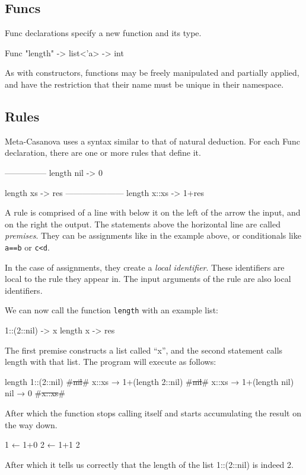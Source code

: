 \subsection{Funcs}
Func declarations specify a new function and its type.

\begin{code}
Func "length" -> list<'a> -> int
\end{code}

As with constructors, functions may be freely manipulated and partially applied, and have the restriction that their name must be unique in their namespace.

\subsection{Rules}
Meta-Casanova uses a syntax similar to that of natural deduction.
For each Func declaration, there are one or more rules that define it.

\begin{code}
---------------
length nil -> 0

length xs -> res
---------------------
length x::xs -> 1+res
\end{code}

A rule is comprised of a line with below it on the left of the arrow the input, and on the right the output.
The statements above the horizontal line are called \textit{premises}\label{premises}.
They can be assignments like in the example above, or conditionals like \verb|a==b| or \verb|c<d|.

In the case of assignments, they create a \textit{local identifier}.
These identifiers are local to the rule they appear in.
The input arguments of the rule are also local identifiers.

We can now call the function \verb|length| with an example list:

\begin{code}
  1::(2::nil) -> x
  length x    -> res
\end{code}

The first premise constructs a list called ``x'', and the second statement calls length with that list.
The program will execute as follows:

\begin{code}
length 1::(2::nil)
    #\st{nil}#
    x::xs → 1+(length 2::nil)
        #\st{nil}#
        x::xs → 1+(length nil)
            nil → 0
            #\st{x::xs}#
\end{code}

\noindent
After which the function stops calling itself and starts accumulating the result on the way down.

\begin{code}[gobble=2]
        1 ← 1+0
    2 ← 1+1
2
\end{code}

\noindent
After which it tells us correctly that the length of the list 1::(2::nil) is indeed 2.
